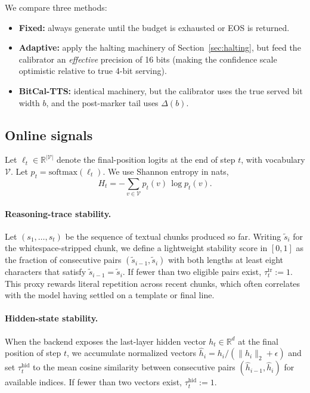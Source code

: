 \documentclass[11pt]{article}
\begin{document}
We compare three methods:
\begin{itemize}
  \item \textbf{Fixed:} always generate until the budget is exhausted or EOS is returned.
  \item \textbf{Adaptive:} apply the halting machinery of Section~\ref{sec:halting}, but feed the calibrator an \emph{effective} precision of 16 bits (making the confidence scale optimistic relative to true 4-bit serving).
  \item \textbf{BitCal-TTS:} identical machinery, but the calibrator uses the true served bit width $b$, and the post-marker tail uses $\Delta(b)$.
\end{itemize}

\subsection{Online signals}
\label{sec:signals}
Let $\ell_t \in \mathbb{R}^{|\mathcal{V}|}$ denote the final-position logits at the end of step $t$, with vocabulary $\mathcal{V}$. Let $p_t = \mathrm{softmax}(\ell_t)$. We use Shannon entropy in nats,
\begin{equation}
  H_t = -\sum_{v \in \mathcal{V}} p_t(v)\,\log p_t(v).
\end{equation}

\paragraph{Reasoning-trace stability.}
Let $(s_1,\ldots,s_t)$ be the sequence of textual chunks produced so far. Writing $\tilde{s}_i$ for the whitespace-stripped chunk, we define a lightweight stability score in $[0,1]$ as the fraction of consecutive pairs $(\tilde{s}_{i-1}, \tilde{s}_i)$ with both lengths at least eight characters that satisfy $\tilde{s}_{i-1}=\tilde{s}_i$. If fewer than two eligible pairs exist, $\tau^{\mathrm{tr}}_t{:=}1$. This proxy rewards literal repetition across recent chunks, which often correlates with the model having settled on a template or final line.

\paragraph{Hidden-state stability.}
When the backend exposes the last-layer hidden vector $h_t \in \mathbb{R}^d$ at the final position of step $t$, we accumulate normalized vectors $\hat{h}_i = h_i / (\lVert h_i\rVert_2 + \epsilon)$ and set $\tau^{\mathrm{hid}}_t$ to the mean cosine similarity between consecutive pairs $(\hat{h}_{i-1}, \hat{h}_i)$ for available indices. If fewer than two vectors exist, $\tau^{\mathrm{hid}}_t{:=}1$.
\end{document}
